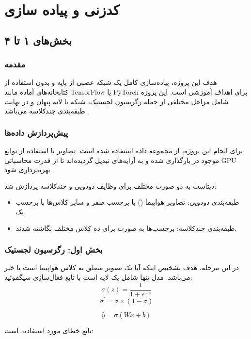 	\section{ کدزنی و پیاده سازی‬}
	
	\subsection{بخش‌های ۱ تا ۴}
	
	\subsubsection{مقدمه}
	
	هدف این پروژه، پیاده‌سازی کامل یک شبکه عصبی از پایه و بدون استفاده از کتابخانه‌های آماده مانند TensorFlow یا PyTorch برای اهداف آموزشی است. این پروژه شامل مراحل مختلفی از جمله رگرسیون لجستیک، شبکه با لایه پنهان و در نهایت طبقه‌بندی چندکلاسه می‌باشد.
	
	\subsubsection{پیش‌پردازش داده‌ها}
	
	برای انجام این پروژه، از مجموعه داده  استفاده شده است. تصاویر با استفاده از توابع موجود در  بارگذاری شده و به آرایه‌های  تبدیل گردیده‌اند تا از قدرت محاسباتی GPU بهره‌برداری شود.
	
	دیتاست به دو صورت مختلف برای وظایف دودویی و چندکلاسه پردازش شد:
	\begin{itemize}
		\item طبقه‌بندی دودویی: تصاویر هواپیما () با برچسب صفر و سایر کلاس‌ها با برچسب یک.
		\item طبقه‌بندی چندکلاسه: برچسب‌ها به صورت  برای ده کلاس مختلف نگاشته شدند.
	\end{itemize}
	
	\subsubsection{بخش اول: رگرسیون لجستیک}
	
	در این مرحله، هدف تشخیص اینکه آیا یک تصویر متعلق به کلاس هواپیما است یا خیر می‌باشد. مدل تنها شامل یک لایه است با تابع فعال‌سازی سیگموئید:
		$$\sigma(z) = \frac{1}{1 + e^{-z}}$$
		\[\sigma^\prime = \sigma \times (1-\sigma)\]
	
	\[
	\hat{y} = \sigma(Wx + b)
	\]


	
	
	تابع خطای مورد استفاده،  است:
	

